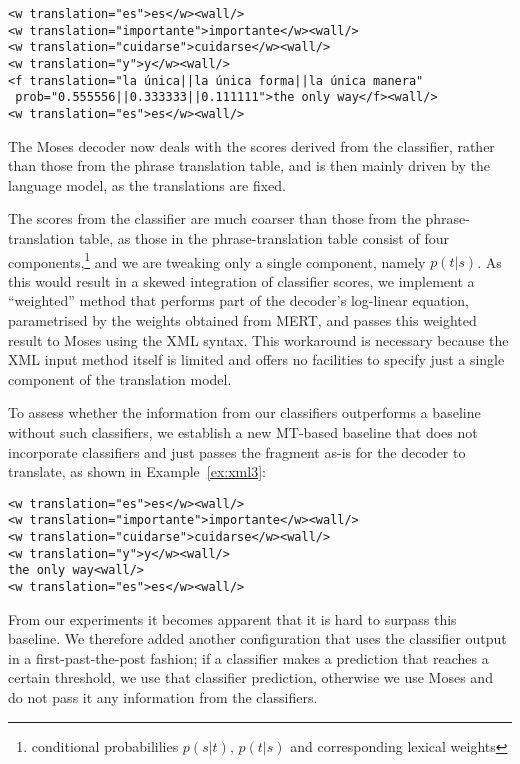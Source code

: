 \begin{exmp}

\label{ex:xml2}
\begin{lstlisting}
<w translation="es">es</w><wall/>
<w translation="importante">importante</w><wall/>
<w translation="cuidarse">cuidarse</w><wall/>
<w translation="y">y</w><wall/>
<f translation="la única||la única forma||la única manera"
 prob="0.555556||0.333333||0.111111">the only way</f><wall/>
<w translation="es">es</w><wall/>
\end{lstlisting}
\end{exmp}

The Moses decoder now deals with the scores derived from the classifier, rather
than those from the phrase translation table, and is then mainly driven by
the language model, as the translations are fixed. 

The scores from the classifier are much coarser than those from the
phrase-translation table, as those in the phrase-translation table consist of
four components,\footnote{conditional probabililies $p(s|t)$, $p(t|s)$ and
corresponding lexical weights} and we are tweaking only a single component,
namely $p(t|s)$. As this would result in a skewed integration of classifier
scores, we implement a ``weighted'' method that performs part of the decoder's
log-linear equation, parametrised by the weights obtained from MERT, and passes
this weighted result to Moses using the XML syntax. This workaround is
necessary because the XML input method itself is limited and offers no
facilities to specify just a single component of the translation model.

To assess whether the information from our classifiers outperforms a baseline
without such classifiers, we establish a new MT-based baseline that does not
incorporate classifiers and just passes the fragment as-is for the decoder to
translate, as shown in Example~\ref{ex:xml3}:

\begin{exmp}
\label{ex:xml3}
\begin{lstlisting}
<w translation="es">es</w><wall/>
<w translation="importante">importante</w><wall/>
<w translation="cuidarse">cuidarse</w><wall/>
<w translation="y">y</w><wall/>
the only way<wall/>
<w translation="es">es</w><wall/>
\end{lstlisting}
\end{exmp}

From our experiments it becomes apparent that it is hard to surpass
this baseline. We therefore added another configuration that uses the
classifier output in a first-past-the-post fashion; if a classifier makes a
prediction that reaches a certain threshold, we use that classifier prediction,
otherwise we use Moses and do not pass it any information from the classifiers.

